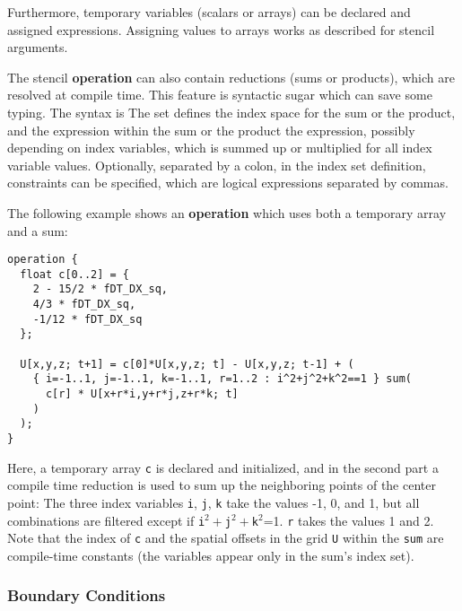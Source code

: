 Furthermore, temporary variables (scalars or arrays) can be declared and assigned expressions.
Assigning values to arrays works as described for stencil arguments.

The stencil \textbf{operation} can also contain reductions (sums or products), which are resolved at compile time.
This feature is syntactic sugar which can save some typing.
The syntax is
\noindent The set defines the index space for the sum or the product, and the expression within the sum or the product
the expression, possibly depending on index variables, which is summed up or multiplied for all index variable values.
Optionally, separated by a colon, in the index set definition, constraints can be specified, which are logical expressions
separated by commas.

The following example shows an \textbf{operation} which uses both a temporary array and a sum:

\begin{lstlisting}[language=stencil]
operation {
  float c[0..2] = {
    2 - 15/2 * fDT_DX_sq,
    4/3 * fDT_DX_sq,
    -1/12 * fDT_DX_sq
  };
    
  U[x,y,z; t+1] = c[0]*U[x,y,z; t] - U[x,y,z; t-1] + (
    { i=-1..1, j=-1..1, k=-1..1, r=1..2 : i^2+j^2+k^2==1 } sum(
      c[r] * U[x+r*i,y+r*j,z+r*k; t]
    )
  );
}
\end{lstlisting}
Here, a temporary array \texttt{c} is declared and initialized, and in the second part a compile time reduction is used
to sum up the neighboring points of the center point:
The three index variables \texttt{i}, \texttt{j}, \texttt{k} take the values -1, 0, and 1, but all combinations are filtered
except if \texttt{i}$^2+$\texttt{j}$^2+$\texttt{k}$^2$=1. \texttt{r} takes the values 1 and 2.
Note that the index of \texttt{c} and the spatial offsets in the grid \texttt{U} within the \texttt{sum} are compile-time
constants (the variables appear only in the sum's index set).


\subsubsection{Boundary Conditions}

